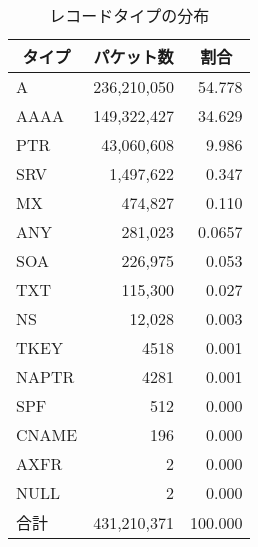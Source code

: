 \begin{table}[htbp]
 \caption{レコードタイプの分布}
 \centering
  \begin{tabular}{lrr}
    \toprule
    \multicolumn{1}{c}{\textbf{タイプ}} & \multicolumn{1}{c}{\textbf{パケット数}} & \multicolumn{1}{c}{\textbf{割合}} \\
    \midrule
    A & 236,210,050 & 54.778 \\
    AAAA & 149,322,427 & 34.629 \\
		PTR & 43,060,608 & 9.986 \\
		SRV & 1,497,622 & 0.347 \\
		MX & 474,827 & 0.110 \\
		ANY & 281,023 & 0.0657 \\
		SOA & 226,975 & 0.053 \\
		\rowcolor[gray]{0.8}%
		TXT & 115,300 & 0.027 \\
		NS & 12,028 & 0.003 \\
		TKEY & 4518 & 0.001 \\
		NAPTR & 4281 & 0.001 \\
		SPF & 512 & 0.000 \\
		\rowcolor[gray]{0.8}%
		CNAME & 196 & 0.000 \\
		AXFR & 2 & 0.000 \\
		\rowcolor[gray]{0.8}%
		NULL & 2 & 0.000 \\ 
		合計 & 431,210,371 & 100.000 \\
    \bottomrule
  \end{tabular}
 \label{tab:distribution-rtype}
\end{table}
